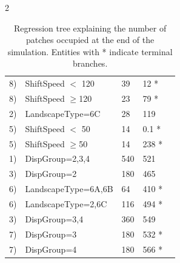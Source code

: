 \documentclass[12pt,pdftex]{article}
\begin{document}
\begin{spacing}{2}
\begin{table}
\begin{tabular}{lllll}
\hspace{3.2cm} 8) 				&ShiftSpeed $<$ 120 				&39 										  		&12 *\\		%

\hspace{3.2cm} 8) 				&ShiftSpeed $\geq$120 				&23 										  		&79 *\\		%
	
\hspace{0.8cm} 2) 				&LandscapeType=6C 				&28 										 		&119  \\		%

\hspace{2cm} 5) 				&ShiftSpeed $<$ 50 					&14 										  		&0.1 *\\		%

\hspace{2cm} 5) 				&ShiftSpeed $\geq$50 				&14 									 			&238 *\\		%

\hspace{0.4cm} 1) 				&DispGroup=2,3,4 					&540 										 	&521  \\		%

\hspace{1.2cm} 3) 				&DispGroup=2 					&180 											&465  \\		%

\hspace{2.4cm} 6) 				&LandscapeType=6A,6B 				&64 										 		&410 *\\		%

\hspace{2.4cm} 6) 				&LandscapeType=2,6C 				&116 									 		&494 *\\		%

\hspace{1.2cm} 3) 				&DispGroup=3,4 					&360 											&549  \\		%
	
\hspace{2.8cm} 7) 				&DispGroup=3 					&180 										 	&532 *\\		%

\hspace{2.8cm} 7)				&DispGroup=4 					&180											&566 *\\		%
\hline
\end{tabular}
\caption{Regression tree explaining the number of patches occupied at the end of the simulation. Entities with * indicate terminal branches.}
\end{table}


\end{spacing}
\end{document}
